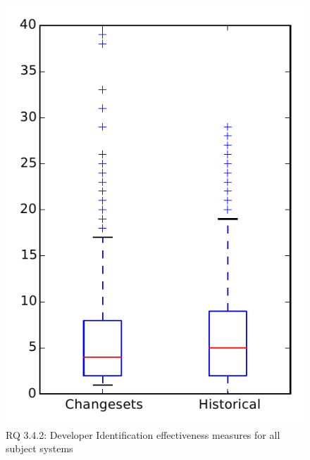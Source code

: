 
\begin{figure}
\centering
\includegraphics[height=0.4\textheight]{figures/dit/rq2_overview}
\caption{RQ 3.4.2: Developer Identification effectiveness measures for all subject systems}
\label{fig:dit:rq2:overview}
\end{figure}
